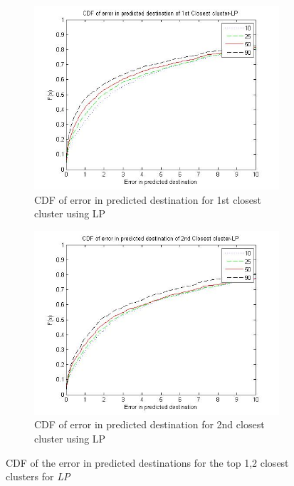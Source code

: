 \begin{figure}
    \centering
    \begin{subfigure}[t]{.5\textwidth}
        \centering
        \includegraphics[scale=0.4]{figs/lp_top.jpg}
        \caption{CDF of error in predicted destination for 1st closest cluster using LP}
    \end{subfigure}%
	\begin{subfigure}[t]{.5\textwidth}
        \centering
        \includegraphics[scale=0.4]{figs/lp_top2.jpg}
        \caption{CDF of error in predicted destination for 2nd closest cluster using LP}
    \end{subfigure}
   \caption{CDF of the error in predicted destinations for the top 1,2 closest clusters for \emph{LP}}
    \label{fig:nextloc_LP}       
\end{figure}

